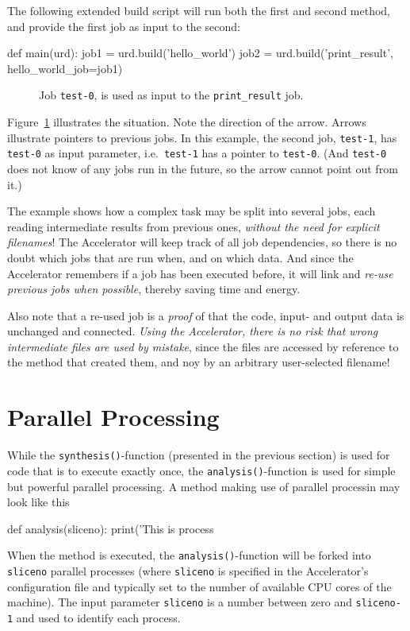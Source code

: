 \clearpage
The following extended build script will run both the first and second
method, and provide the first job as input to the second:
\begin{python}
def main(urd):
    job1 = urd.build('hello_world')
    job2 = urd.build('print_result', hello_world_job=job1)
\end{python}

\begin{figure}[t]
    \hspace{1.5cm}
    \caption{Job \texttt{test-0}, is used as input to the
      \texttt{print\_result} job.}
    \label{fig:execflow-print-result}
\end{figure}

Figure~\ref{fig:execflow-print-result} illustrates the situation.
Note the direction of the arrow.  Arrows illustrate pointers to
previous jobs.  In this example, the second job, \texttt{test-1}, has
\texttt{test-0} as input parameter, i.e.\ \texttt{test-1} has a
pointer to \texttt{test-0}.  (And \texttt{test-0} does not know of any
jobs run in the future, so the arrow cannot point out from it.)

The example shows how a complex task may be split into several jobs,
each reading intermediate results from previous ones, \emph{without
the need for explicit filenames}!  The Accelerator will keep track of
all job dependencies, so there is no doubt which jobs that are run
when, and on which data.  And since the Accelerator remembers if a job
has been executed before, it will link and \emph{re-use previous jobs
when possible}, thereby saving time and energy.

Also note that a re-used job is a \emph{proof} of that the code,
input- and output data is unchanged and connected.  \emph{Using the
Accelerator, there is no risk that wrong intermediate files are used
by mistake}, since the files are accessed by reference to the method
that created them, and noy by an arbitrary user-selected filename!


\section{Parallel Processing}

While the \texttt{synthesis()}-function (presented in the previous
section) is used for code that is to execute exactly once, the
\texttt{analysis()}-function is used for simple but powerful parallel
processing.  A method making use of parallel processin may look like
this
\begin{python}
def analysis(sliceno):
    print('This is process %
\end{python}
When the method is executed, the \texttt{analysis()}-function will be
forked into \texttt{sliceno} parallel processes (where
\texttt{sliceno} is specified in the Accelerator's configuration file
and typically set to the number of available CPU cores of the
machine).  The input parameter \texttt{sliceno} is a number between
zero and \texttt{sliceno-1} and used to identify each process.

